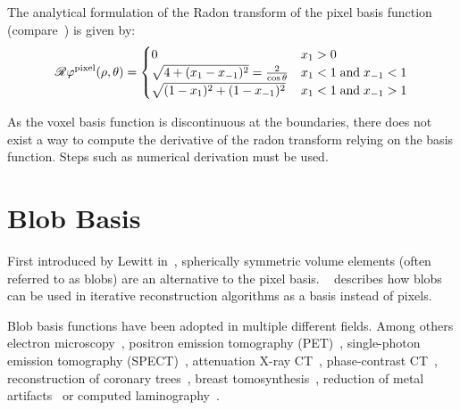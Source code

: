 The analytical formulation of the Radon transform of the pixel basis function
(compare~\cite{toft_radon_1996}) is given by:
\begin{equation}\label{eq:radon_voxel_basis}
	\mathscr{R}\varphi^{\text{pixel}}(\rho, \theta) =
	\begin{cases}
		0                                                  & x_1 > 0                         \\
		\sqrt{4 + (x_1 - x_{-1})^2} = \frac{2}{\cos\theta} & x_1 < 1\;\text{and}\;x_{-1} < 1 \\
		\sqrt{(1 - x_1)^2 + (1 - x_{-1})^2}                & x_1 < 1\;\text{and}\;x_{-1} > 1
	\end{cases}
\end{equation}

As the voxel basis function is discontinuous at the boundaries, there does not exist a way to
compute the derivative of the radon transform relying on the basis function. Steps such as numerical
derivation must be used.


\section{Blob Basis}\label{sec:blob_basis}

First introduced by Lewitt in~\cite{lewitt_multidimensional_1990}, spherically symmetric volume
elements (often referred to as blobs) are an alternative to the pixel basis.
~\cite{lewitt_alternatives_1992} describes how blobs can be used in iterative reconstruction
algorithms as a basis instead of pixels.

Blob basis functions have been adopted in multiple different fields. Among others electron
microscopy~\cite{marabini_3d_1998, garduno_optimization_2001}, positron emission tomography
(PET)~\cite{jacobs_comparative_1999, chlewicki_noise_2004}, single-photon emission tomography
(SPECT)~\cite{wang_3d_2004, yendiki_comparison_2004}, attenuation X-ray
CT~\cite{jacobs_iterative_1999, carvalho_helical_2003, isola_motion-compensated_2008},
phase-contrast CT~\cite{kohler_iterative_2011, xu_investigation_2012}, reconstruction of coronary
trees~\cite{zhou_blob-based_2008}, breast tomosynthesis~\cite{wu_breast_2010}, reduction of metal
artifacts~\cite{levakhina_two-step_2010} or computed laminography~\cite{trampert_spherically_2017}.


